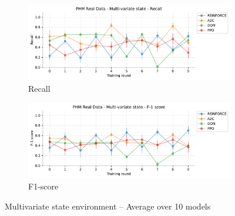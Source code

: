 \documentclass[a4paper, 12pt]{article}
\begin{document}
\begin{appendices}
\begin{figure}[h]
	\begin{subfigure}{\textwidth}
		\centering
		\includegraphics[width=\linewidth]{Multivariate_Rc.pdf}  
		\caption{Recall}
		\label{fig:tr-ms-rc}
	\end{subfigure} \par\smallskip
	
	\begin{subfigure}{\textwidth}
		\centering
		\includegraphics[width=\linewidth]{Multivariate_F1.pdf}  
		\caption{F1-score}
		\label{fig:tr-ms-f1}
	\end{subfigure} \par\smallskip
	\caption{Multivariate state environment -- Average over 10 models}
	\label{fig:tr-ms-env}
\end{figure}


\end{appendices}
\end{document}
